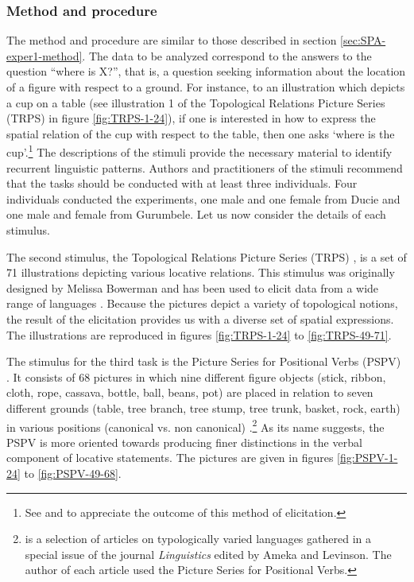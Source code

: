 \subsubsection{Method and procedure}
\label{sec:SPA-exper2-method}

The method and procedure are similar to those described in section
\ref{sec:SPA-exper1-method}. The data to be analyzed correspond to the answers
to the question ``where is X?'',   that is,  a question seeking information
about the location of a figure with respect to a ground. For instance, to an
illustration which depicts a cup  on a table (see  illustration 1 of the
Topological Relations Picture Series (TRPS) in figure \ref{fig:TRPS-1-24}),  if
one is interested in how to express  the spatial relation of the cup with
respect to the table, then one asks `where is the cup'.\footnote{See 
\cite{Levi03b} and 
\citet[553-562]{Levi06} to appreciate the outcome of this
method of
elicitation.}  The descriptions of the stimuli provide the necessary material to
identify recurrent linguistic patterns.  Authors and  practitioners of the
stimuli recommend that the tasks should be conducted with at least three 
individuals.  Four individuals conducted the experiments,  one male and one
female from Ducie and one male and female from Gurumbele. Let us now consider
the
details of each  stimulus.



The second stimulus, the Topological Relations
Picture Series
(TRPS) \citep{Bowe93},  is a set of
71  illustrations depicting various locative
relations. This stimulus was originally
designed by Melissa Bowerman and has been used to elicit data from a wide range
of languages \cite[see][7-9]{Levi06}. Because  the pictures depict a variety of
topological notions,  the result of the elicitation provides us with a diverse
set of spatial expressions. The illustrations are reproduced in figures
\ref{fig:TRPS-1-24} to \ref{fig:TRPS-49-71}.

The stimulus for the third task is the  Picture Series for Positional
Verbs (PSPV)  \citep{Amek99}. It consists of 68  pictures in which nine
different
figure objects (stick, ribbon, cloth, rope, cassava, bottle, ball, beans, pot)
are  placed in relation to seven different grounds (table, tree branch, tree
stump, tree trunk, basket, rock, earth)  in various positions (canonical vs.
non canonical) \citep[861]{Amek07b}.\footnote{\cite{Amek07b} is a selection of
articles  on typologically varied languages  
gathered in a special issue
of the journal {\it Linguistics} edited by Ameka and Levinson. The author of
each
article used the  Picture Series for Positional Verbs. } As its name suggests,
the PSPV is more
oriented towards producing finer distinctions in the verbal component of
locative statements. The pictures are given in figures \ref{fig:PSPV-1-24} to
\ref{fig:PSPV-49-68}.


